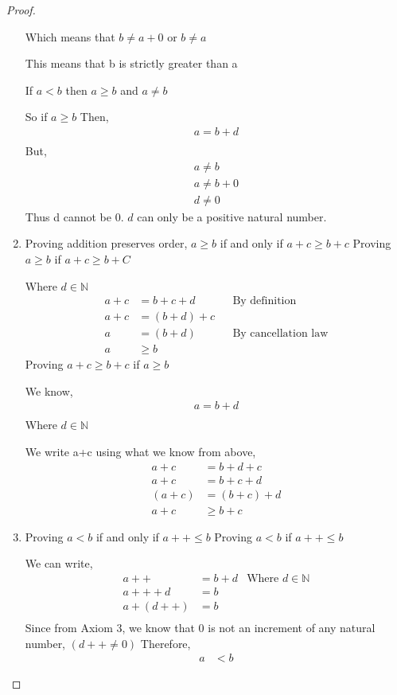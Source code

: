 \documentclass[11pt]{report}
\begin{document}
\begin{proof}
\begin{enumerate}
Which means that $b \neq a + 0$ or $b \neq a$

This means that b is strictly greater than a

If $a<b$ then $a \geq b$ and $a \neq b$

So if $a \geq b$
Then,
\begin{align*}
a = b + d \\
\end{align*}
But,
\begin{align*}
a \neq b \\
a \neq b + 0 \\
d \neq 0
\end{align*}
Thus d cannot be 0. $d$ can only be a positive natural number.
\item Proving addition preserves order, $a \geq b$ if and only if $a + c \geq b + c$
Proving $a \geq b$ if $a + c \geq b + C$

Where $d \in \mathbb{N}$
\begin{align*}
a + c &= b + c + d & &\text{By definition} \\
a + c &= (b+d) + c & \\
a &= (b+d) & &\text{By cancellation law}\\
a &\geq b
\end{align*}
Proving $a + c \geq b +c$ if $a \geq b$

We know,
\begin{align*}
a = b + d \\
\end{align*}
Where $d \in \mathbb{N}$

We write a+c using what we know from above,
\begin{align*}
a + c &= b + d + c \\
a + c &= b + c + d \\
(a + c) &= (b + c) + d \\
a + c &\geq b + c
\end{align*}

\item Proving $a < b$ if and only if $a++ \leq b$
Proving $a < b$ if $a++ \leq b$

We can write,
\begin{align*}
a++ &= b + d &\text{Where $d \in \mathbb{N}$} \\
a++ + d &= b  \\
a + (d++) &= b \\
\end{align*}
Since from Axiom 3, we know that 0 is not an increment of any natural number, $(d++ \neq 0)$
Therefore,
\begin{align*}
a &< b
\end{align*}

\end{enumerate}
\end{proof}
\end{document}
